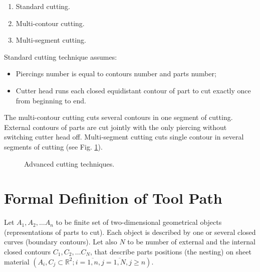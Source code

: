 \documentclass{../download/tPRS2e}
\begin{document}
\begin{enumerate}
\item Standard cutting. 
\item Multi-contour cutting.
\item Multi-segment cutting.
\end{enumerate}

Standard cutting technique assumes:

\begin{itemize}
\item Piercings number is equal to contours number and parts number;
\item Cutter head runs each closed equidistant contour of part to cut exactly once from beginning to end. 
\end{itemize}

The multi-contour cutting cuts several contours in one segment of cutting.
External contours of parts are cut jointly with the only piercing without switching cutter head off.
Multi-segment cutting cuts single contour in several segments of cutting (see Fig. \ref{technics}).

\begin{figure}
\begin{center}
\caption{Advanced cutting techniques.} \label{technics}
\end{center}
\end{figure}


\section{Formal Definition of Tool Path}

Let $A_1, A_2, \dots A_n$ to be finite set of two-dimensional geometrical objects
(representations of parts to cut).
Each object is described by one or several closed curves (boundary contours). 
Let also $N$ to be number of external and the internal closed contours $C_1, C_2, \dots C_N$,
that describe parts positions (the nesting) on sheet material
$(A_i, C_j \subset \mathbb{R}^2; i = \overline{1,n}, j = \overline{1, N}, j \ge n )$.
\end{document}
